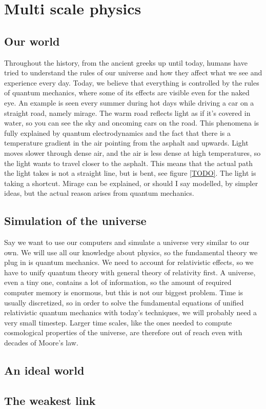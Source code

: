 \section{Multi scale physics}

\subsection{Our world}
Throughout the history, from the ancient greeks up until today, humans have tried to understand the rules of our universe and how they affect what we see and experience every day. Today, we believe that everything is controlled by the rules of quantum mechanics, where some of its effects are visible even for the naked eye. An example is seen every summer during hot days while driving a car on a straight road, namely mirage. The warm road reflects light as if it's covered in water, so you can see the sky and oncoming cars on the road. This phenomena is fully explained by quantum electrodynamics and the fact that there is a temperature gradient in the air pointing from the asphalt and upwards. Light moves slower through dense air, and the air is less dense at high temperatures, so the light wants to travel closer to the asphalt. This means that the actual path the light takes is not a straight line, but is bent, see figure \ref{TODO}. The light is taking a shortcut. Mirage can be explained, or should I say modelled, by simpler ideas, but the actual reason arises from quantum mechanics. 

\subsection{Simulation of the universe}
Say we want to use our computers and simulate a universe very similar to our own. We will use all our knowledge about physics, so the fundamental theory we plug in is quantum mechanics. We need to account for relativistic effects, so we have to unify quantum theory with general theory of relativity first. A universe, even a tiny one, contains a lot of information, so the amount of required computer memory is enormous, but this is not our biggest problem. Time is usually discretized, so in order to solve the fundamental equations of unified relativistic quantum mechanics with today's techniques, we will probably need a very small timestep. Larger time scales, like the ones needed to compute cosmological properties of the universe, are therefore out of reach even with decades of Moore's law. 

\subsection{An ideal world}

\subsection{The weakest link}


